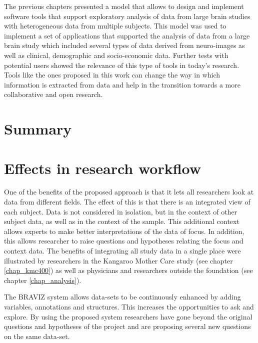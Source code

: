 The previous chapters presented a model that allows to design and implement software tools that support exploratory analysis of data from large brain studies with heterogeneous data from multiple subjects. This model was used to implement a set of applications that supported the analysis of data from a large brain study which included several types of data derived from neuro-images as well as clinical, demographic and socio-economic data. Further tests with potential users showed the relevance of this type of tools in today's research. Tools like the ones proposed in this work can change the way in which information is extracted from data and help in the transition towards a more collaborative and open research. 

\section{Summary}

\section{Effects in research workflow}



One of the benefits of the proposed approach is that it lets all researchers look at data from different fields. The effect of this is that there is an integrated view of each subject. Data is not considered in isolation, but in the context of other subject data, as well as in the context of the sample. This additional context allows experts to make better interpretations of the data of focus. In addition, this allows researcher to raise questions and hypotheses relating the focus and context data. The benefits of integrating all study data in a single place were illustrated by researchers in the Kangaroo Mother Care study (see chapter \ref{chap_kmc400}) as well as physicians and researchers outside the foundation (see chapter \ref{chap_analysis}).


The BRAVIZ system allows data-sets to be continuously enhanced by adding variables, annotations and structures. This increases the opportunities to ask and explore.  By using the proposed system researchers have gone beyond the original questions and hypotheses of the project and are proposing several new questions on the same data-set. 

